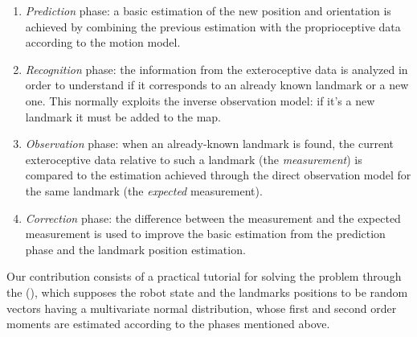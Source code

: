 \begin{enumerate}
	\item \emph{Prediction} phase: a basic estimation of the new position and orientation is achieved by combining the previous estimation with the proprioceptive data according to the motion model.
	\item \emph{Recognition} phase: the information from the exteroceptive data is analyzed in order to understand if it corresponds to an already known landmark or a new one. This normally exploits the inverse observation model: if it's a new landmark it must be added to the map.
	\item \emph{Observation} phase: when an already-known landmark is found, the current exteroceptive data relative to such a landmark (the \emph{measurement}) is compared to the estimation achieved through the direct observation model for the same landmark (the \emph{expected} measurement).
	\item \emph{Correction} phase: the difference between the measurement and the expected measurement is used to improve the basic estimation from the prediction phase and the landmark position estimation.
\end{enumerate}

Our contribution consists of a practical tutorial for solving the \SLAM{} problem through the \emph{\Ekf} (\EKF), which supposes the robot state and the landmarks positions to be random vectors having a multivariate normal distribution, whose first and second order moments are estimated according to the phases mentioned above.

\nocite{brenner204}
\nocite{frischenschlager2013}
\nocite{slamForDummies}
\nocite{sola204}
\nocite{thrun2005}
\nocite{wiki:slam}
